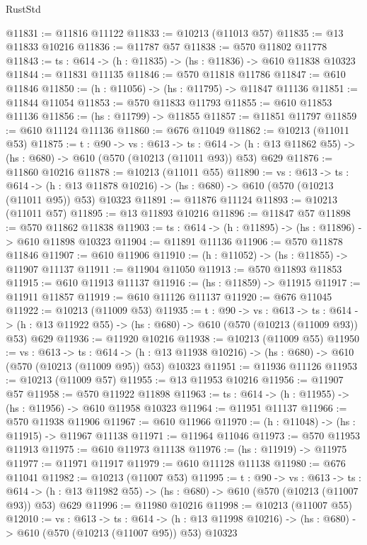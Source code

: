 \begin{lexlean}{RustStd}
\begin{coremodule}
@11831 := @11816 @11122
@11833 := @10213 (@11013 @57)
@11835 := @13 @11833 @10216
@11836 := @11787 @57
@11838 := @570 @11802 @11778
@11843 := {ts : @614} -> (h : @11835) -> (hs : @11836) -> @610 @11838 @10323
@11844 := @11831 @11135
@11846 := @570 @11818 @11786
@11847 := @610 @11846
@11850 := (h : @11056) -> (hs : @11795) -> @11847 @11136
@11851 := @11844 @11054
@11853 := @570 @11833 @11793
@11855 := @610 @11853 @11136
@11856 := (hs : @11799) -> @11855
@11857 := @11851 @11797
@11859 := @610 @11124 @11136
@11860 := @676 @11049
@11862 := @10213 (@11011 @53)
@11875 := {t : @90} ->
  {vs : @613} ->
  {ts : @614} -> (h : @13 @11862 @55) -> (hs : @680) -> @610 (@570 (@10213 (@11011 @93)) @53) @629
@11876 := @11860 @10216
@11878 := @10213 (@11011 @55)
@11890 := {vs : @613} ->
  {ts : @614} ->
  (h : @13 @11878 @10216) -> (hs : @680) -> @610 (@570 (@10213 (@11011 @95)) @53) @10323
@11891 := @11876 @11124
@11893 := @10213 (@11011 @57)
@11895 := @13 @11893 @10216
@11896 := @11847 @57
@11898 := @570 @11862 @11838
@11903 := {ts : @614} -> (h : @11895) -> (hs : @11896) -> @610 @11898 @10323
@11904 := @11891 @11136
@11906 := @570 @11878 @11846
@11907 := @610 @11906
@11910 := (h : @11052) -> (hs : @11855) -> @11907 @11137
@11911 := @11904 @11050
@11913 := @570 @11893 @11853
@11915 := @610 @11913 @11137
@11916 := (hs : @11859) -> @11915
@11917 := @11911 @11857
@11919 := @610 @11126 @11137
@11920 := @676 @11045
@11922 := @10213 (@11009 @53)
@11935 := {t : @90} ->
  {vs : @613} ->
  {ts : @614} -> (h : @13 @11922 @55) -> (hs : @680) -> @610 (@570 (@10213 (@11009 @93)) @53) @629
@11936 := @11920 @10216
@11938 := @10213 (@11009 @55)
@11950 := {vs : @613} ->
  {ts : @614} ->
  (h : @13 @11938 @10216) -> (hs : @680) -> @610 (@570 (@10213 (@11009 @95)) @53) @10323
@11951 := @11936 @11126
@11953 := @10213 (@11009 @57)
@11955 := @13 @11953 @10216
@11956 := @11907 @57
@11958 := @570 @11922 @11898
@11963 := {ts : @614} -> (h : @11955) -> (hs : @11956) -> @610 @11958 @10323
@11964 := @11951 @11137
@11966 := @570 @11938 @11906
@11967 := @610 @11966
@11970 := (h : @11048) -> (hs : @11915) -> @11967 @11138
@11971 := @11964 @11046
@11973 := @570 @11953 @11913
@11975 := @610 @11973 @11138
@11976 := (hs : @11919) -> @11975
@11977 := @11971 @11917
@11979 := @610 @11128 @11138
@11980 := @676 @11041
@11982 := @10213 (@11007 @53)
@11995 := {t : @90} ->
  {vs : @613} ->
  {ts : @614} -> (h : @13 @11982 @55) -> (hs : @680) -> @610 (@570 (@10213 (@11007 @93)) @53) @629
@11996 := @11980 @10216
@11998 := @10213 (@11007 @55)
@12010 := {vs : @613} ->
  {ts : @614} ->
  (h : @13 @11998 @10216) -> (hs : @680) -> @610 (@570 (@10213 (@11007 @95)) @53) @10323

\end{coremodule}
\end{lexlean}
